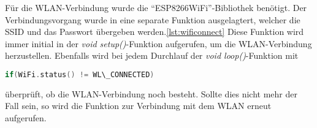 Für die WLAN-Verbindung wurde die "`ESP8266WiFi"'-Bibliothek benötigt.
Der Verbindungsvorgang wurde in eine separate Funktion ausgelagtert, welcher die SSID und das Passwort übergeben werden.\ref{lst:wificonnect}
Diese Funktion wird immer initial in der \textit{void setup()}-Funktion aufgerufen, um die WLAN-Verbindung herzustellen.
Ebenfalls wird bei jedem Durchlauf der \textit{void loop()}-Funktion mit 
\begin{lstlisting}[language=C++]
	if(WiFi.status() != WL\_CONNECTED)
\end{lstlisting}
überprüft, ob die WLAN-Verbindung noch besteht.
Sollte dies nicht mehr der Fall sein, so wird die Funktion zur Verbindung mit dem WLAN erneut aufgerufen.
